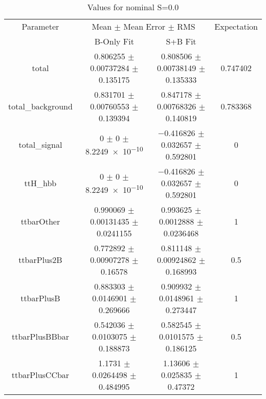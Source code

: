 \begin{table}
\centering
\caption{Values for nominal S=0.0}
\begin{tabular}{cccc}
\toprule
Parameter & \multicolumn{2}{c}{Mean $\pm$ Mean Error $\pm$ RMS} & Expectation\\
 & B-Only Fit & S+B Fit & \\
\midrule
total & \num{0.806255} $\pm$ \num{0.00737284} $\pm$ \num{0.135175} & \num{0.808506} $\pm$ \num{0.00738149} $\pm$ \num{0.135333} & \num{0.747402}\\
total\_background & \num{0.831701} $\pm$ \num{0.00760553} $\pm$ \num{0.139394} & \num{0.847178} $\pm$ \num{0.00768326} $\pm$ \num{0.140819} & \num{0.783368}\\
total\_signal & \num{0} $\pm$ \num{0} $\pm$ \num{8.2249e-10} & \num{-0.416826} $\pm$ \num{0.032657} $\pm$ \num{0.592801} & \num{0}\\
ttH\_hbb & \num{0} $\pm$ \num{0} $\pm$ \num{8.2249e-10} & \num{-0.416826} $\pm$ \num{0.032657} $\pm$ \num{0.592801} & \num{0}\\
ttbarOther & \num{0.990069} $\pm$ \num{0.00131435} $\pm$ \num{0.0241155} & \num{0.993625} $\pm$ \num{0.0012888} $\pm$ \num{0.0236468} & \num{1}\\
ttbarPlus2B & \num{0.772892} $\pm$ \num{0.00907278} $\pm$ \num{0.16578} & \num{0.811148} $\pm$ \num{0.00924862} $\pm$ \num{0.168993} & \num{0.5}\\
ttbarPlusB & \num{0.883303} $\pm$ \num{0.0146901} $\pm$ \num{0.269666} & \num{0.909932} $\pm$ \num{0.0148961} $\pm$ \num{0.273447} & \num{1}\\
ttbarPlusBBbar & \num{0.542036} $\pm$ \num{0.0103075} $\pm$ \num{0.188873} & \num{0.582545} $\pm$ \num{0.0101575} $\pm$ \num{0.186125} & \num{0.5}\\
ttbarPlusCCbar & \num{1.1731} $\pm$ \num{0.0264498} $\pm$ \num{0.484995} & \num{1.13606} $\pm$ \num{0.025835} $\pm$ \num{0.47372} & \num{1}\\
\bottomrule
\end{tabular}
\end{table}